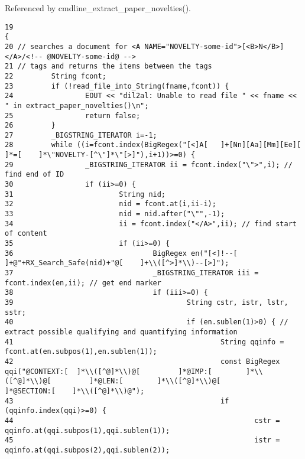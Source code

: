 Referenced by cmdline\_\-extract\_\-paper\_\-novelties().



\footnotesize\begin{verbatim}19                                                                                 {
20 // searches a document for <A NAME="NOVELTY-some-id">[<B>N</B>]</A>/<!-- @NOVELTY-some-id@ -->
21 // tags and returns the items between the tags
22         String fcont;
23         if (!read_file_into_String(fname,fcont)) {
24                 EOUT << "dil2al: Unable to read file " << fname << " in extract_paper_novelties()\n";
25                 return false;
26         }
27         _BIGSTRING_ITERATOR i=-1;
28         while ((i=fcont.index(BigRegex("[<]A[   ]+[Nn][Aa][Mm][Ee][     ]*=[    ]*\"NOVELTY-[^\"]*\"[>]"),i+1))>=0) {
29                 _BIGSTRING_ITERATOR ii = fcont.index("\">",i); // find end of ID
30                 if (ii>=0) {
31                         String nid;
32                         nid = fcont.at(i,ii-i);
33                         nid = nid.after("\"",-1);
34                         ii = fcont.index("</A>",ii); // find start of content
35                         if (ii>=0) {
36                                 BigRegex en("[<]!--[    ]+@"+RX_Search_Safe(nid)+"@[    ]+\\([^>]*\\)--[>]");
37                                 _BIGSTRING_ITERATOR iii = fcont.index(en,ii); // get end marker
38                                 if (iii>=0) {
39                                         String cstr, istr, lstr, sstr;
40                                         if (en.sublen(1)>0) { // extract possible qualifying and quantifying information
41                                                 String qqinfo = fcont.at(en.subpos(1),en.sublen(1));
42                                                 const BigRegex qqi("@CONTEXT:[  ]*\\([^@]*\\)@[         ]*@IMP:[        ]*\\([^@]*\\)@[         ]*@LEN:[        ]*\\([^@]*\\)@[         ]*@SECTION:[    ]*\\([^@]*\\)@");
43                                                 if (qqinfo.index(qqi)>=0) {
44                                                         cstr = qqinfo.at(qqi.subpos(1),qqi.sublen(1));
45                                                         istr = qqinfo.at(qqi.subpos(2),qqi.sublen(2));

\end{verbatim}
